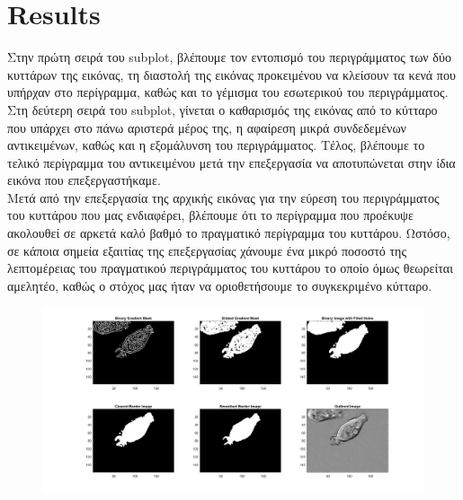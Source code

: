 \documentclass{article}
\begin{document}
	\pagebreak
\section*{Results}
	Στην πρώτη σειρά του subplot, βλέπουμε τον εντοπισμό του περιγράμματος των δύο κυττάρων της εικόνας, τη διαστολή της εικόνας προκειμένου να κλείσουν τα κενά που υπήρχαν στο περίγραμμα, καθώς και το γέμισμα του εσωτερικού του περιγράμματος. Στη δεύτερη σειρά του subplot, γίνεται ο καθαρισμός της εικόνας από το κύτταρο που υπάρχει στο πάνω αριστερά μέρος της, η αφαίρεση μικρά συνδεδεμένων αντικειμένων, καθώς και η εξομάλυνση του περιγράμματος. Τέλος, βλέπουμε το τελικό περίγραμμα του αντικειμένου μετά την επεξεργασία να αποτυπώνεται στην ίδια εικόνα που επεξεργαστήκαμε.\\
	
	\noindent
	Μετά από την επεξεργασία της αρχικής εικόνας για την εύρεση του περιγράμματος του κυττάρου που μας ενδιαφέρει, βλέπουμε ότι το περίγραμμα που προέκυψε ακολουθεί σε αρκετά καλό βαθμό το πραγματικό περίγραμμα του κυττάρου. Ωστόσο, σε κάποια σημεία εξαιτίας της επεξεργασίας χάνουμε ένα μικρό ποσοστό της λεπτομέρειας του πραγματικού περιγράμματος του κυττάρου το οποίο όμως θεωρείται αμελητέο, καθώς ο στόχος μας ήταν να οριοθετήσουμε το συγκεκριμένο κύτταρο. 
	\begin{figure}[h!]
		\centering
		\includegraphics[height=\linewidth, width=\linewidth]{./output_images/lab5_results.jpg}
	\end{figure}
	
\pagebreak
\end{document}
